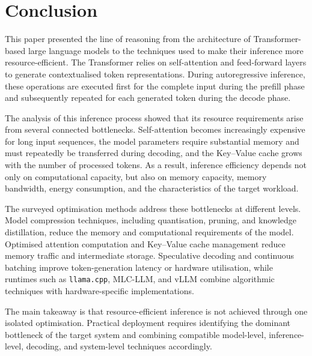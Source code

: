 \chapter{Conclusion}\label{chap:conclusion}

This paper presented the line of reasoning from the architecture of Transformer-based
large language models to the techniques used to make their inference more resource-efficient.
The Transformer relies on self-attention and feed-forward layers to generate contextualised
token representations. During autoregressive inference, these operations are executed first
for the complete input during the prefill phase and subsequently repeated for each generated
token during the decode phase.

The analysis of this inference process showed that its resource requirements arise from
several connected bottlenecks. Self-attention becomes increasingly expensive for long input
sequences, the model parameters require substantial memory and must repeatedly be
transferred during decoding, and the Key--Value cache grows with the number of processed
tokens. As a result, inference efficiency depends not only on computational capacity, but
also on memory capacity, memory bandwidth, energy consumption, and the characteristics
of the target workload.

The surveyed optimisation methods address these bottlenecks at different levels. Model
compression techniques, including quantisation, pruning, and knowledge distillation, reduce
the memory and computational requirements of the model. Optimised attention computation
and Key--Value cache management reduce memory traffic and intermediate storage.
Speculative decoding and continuous batching improve token-generation latency or hardware
utilisation, while runtimes such as \texttt{llama.cpp}, MLC-LLM, and vLLM combine
algorithmic techniques with hardware-specific implementations.

The main takeaway is that resource-efficient inference is not achieved through one isolated
optimisation. Practical deployment requires identifying the dominant bottleneck of the
target system and combining compatible model-level, inference-level, decoding, and
system-level techniques accordingly.
